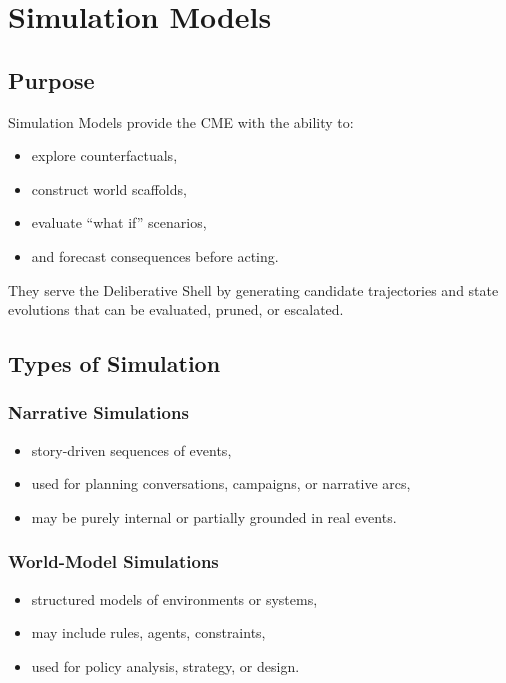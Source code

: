 \chapter{Simulation Models}
\label{chap:Simulation_Models}

\section{Purpose}

Simulation Models provide the CME with the ability to:
\begin{itemize}
    \item explore counterfactuals,
    \item construct world scaffolds,
    \item evaluate ``what if'' scenarios,
    \item and forecast consequences before acting.
\end{itemize}

They serve the Deliberative Shell by generating candidate trajectories and
state evolutions that can be evaluated, pruned, or escalated.

\section{Types of Simulation}

\subsection{Narrative Simulations}

\begin{itemize}
    \item story-driven sequences of events,
    \item used for planning conversations, campaigns, or narrative arcs,
    \item may be purely internal or partially grounded in real events.
\end{itemize}

\subsection{World-Model Simulations}

\begin{itemize}
    \item structured models of environments or systems,
    \item may include rules, agents, constraints,
    \item used for policy analysis, strategy, or design.
\end{itemize}

